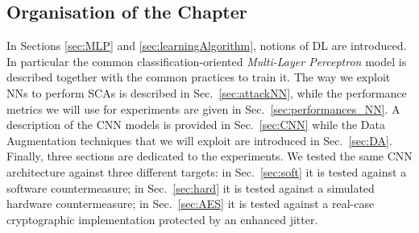 \subsection*{Organisation of the Chapter}
In Sections \ref{sec:MLP} and \ref{sec:learningAlgorithm}, notions of DL are introduced. In particular the common classification-oriented \emph{Multi-Layer Perceptron} model is described together with the common practices to train it. The way we exploit NNs to perform SCAs is described in Sec.~\ref{sec:attackNN}, while the performance metrics we will use for experiments are given in Sec.~\ref{sec:performances_NN}. A description of the CNN models is provided in Sec.~\ref{sec:CNN} while the Data Augmentation techniques that we will exploit are introduced in Sec.~\ref{sec:DA}.  Finally, three sections are dedicated to the experiments. We tested the same CNN architecture against three different targets: in Sec.~\ref{sec:soft}  it is tested against a software countermeasure; in Sec.~\ref{sec:hard} it is tested against a simulated hardware countermeasure;  in Sec.~\ref{sec:AES} it is tested against a real-case cryptographic implementation protected by an enhanced jitter. 





